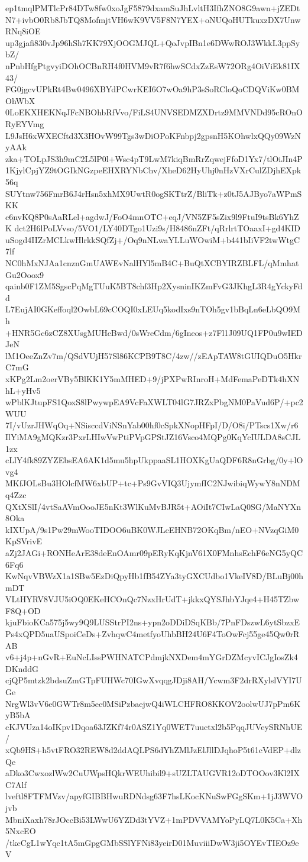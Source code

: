 ep1tmqlPMTlcPr84DTw8fw0xoJgF5879dxamSuJhLvltH3IfhZNO8G9awn+jZEDt
N7+ivbO0Rb8JbTQ8MofmjtVH6wK9VV5F8N7YEX+oNUQoHUTkuxzDX7UnwRNq8iOE
up3gjafi830vJp96hSh7KK79XjOOGMJQL+QoJvpIBn1e6DWwROJ3WkkL3ppSybZ/
nPnbHfgPtgvyiDOhOCBnRH4f0HVM9vR7f6hwSCdxZzEsW72ORg4OiViEk81IX43/
FG0jgcvUPkRt4Bw0496XBYdPCwrKEI6O7wOa9hP3sSoRCloQoCDQViKw0BMOhWbX
0LoEKXHEKNqJFcNBOhbRfVvo/FiLS4UNVSEDMZXDrtz9MMVNDd95cROnORyEYVmg
L9JsH6xWXECftd3X3HOvW99Tgs3wDiOPoKFnbpj2gpsnH5KOhwlxQQy09WzNyAAk
zka+TOLpJS3h9mC2L5lP0l+Wsc4pT9LwM7kiqBmRrZqwejFfoD1Yx7/tlOiJIn4P
1KjylCpjYZ9tOGIkNGzpeEHXRYNbChv/XheD62HyUhj0nHzVXrCulZDjhEXpk56q
SUYtnw756FmrB6J4rHsn5xhMX9UwtR0ogSKTtrZ/BliTk+z0tJ5AJByo7aWPmSKK
c6nvKQ8P0sAaRLel+agdwJ/FoO4mnOTC+eqJ/VN5ZF5sZix9l9FtuI9tsBk6YhZK
dct2H6lPoLVvso/5VO1/LY40DTgo1Uzi9s/H8486nZFt/qRrlrtTOaaxI+gd4KID
uSogd4IIZrMCLkwHlrkkSQfZj+/Oq9nNLwaYLLuWOwiM+b441bIiVF2twWtgC7lf
NC0hMxNJAa1cnznGmUAWEvNalHYl5mB4C+BuQtXCBYIRZBLFL/qMmhatGu2Ooox9
qainb0F1ZM5SgscPqMgTUuK5BT8chf3Hp2XysninIKZmFvG3JKhgL3R4gYckyFdd
L7EujAI0GKeffoql2OwbL69cCOQI0xLEUq5kodIxs9nTOh5gv1bBqLn6eLbQO9Mh
+HNR5Gc6zCZ8XUsgMUHcBwd/0sWreCdm/6gIneos+z7Fl1J09UQ1FP0u9wIEDJeN
lM1OeeZnZv7m/QSdVUjH57Sl86KCPB9T8C/4zw//zEApTAW8tGUIQDuO5HkrC7mG
xKPg2Lm2oerVBy5BlKK1Y5mMHED+9/jPXPwRInroH+MdFemaPeDTk4hXNhL+yHv5
wPblKJtupFS1QoxS8lPwywpEA9VcFaXWLT04lG7JRZxPbgNM0PaVud6P/+pc2WUU
7I/vUzrJHWqOq+NSisccdViNSnYab00hf0cSpkXNopHFpI/D/O8i/PTscs1Xw/r6
IlYiMA9gMQKzr3PxrLHIwVwPtiPVpGPStJZ16Vsco4MQPg0KqYcIULDA8sCJL1zx
cLlY4fk89ZYZEbsEA6AK1d5mu5hpUkppaaSL1HOXKgUaQDF6R8nGrbg/0y+lOvg4
MKfJOLsBu3HOlcfMW6xbUP+tc+Ps9GvVIQ3UjymfIC2NJwibiqWywY8nNDMq4Zzc
QXtXSlI/4vtSaAVmOooJE5nKt3WlKuMvBJR5t+AOiIt7CIwLaQ0SG/MaNYXn8Oka
kIXUpA/9s1Pw29mWooTIDOO6uBK0WJLcEHNB72OKqBm/nEO+NVzqGiM0KpSVrivE
aZj2JAGi+RONHeArE38deEnOAmr09pERyKqKjnV61X0FMnhsEchF6eNG5yQC6Fq6
KwNqvVBWzX1a1SBw5EzDiQpyHb1fB54ZYa3tyGXCUdbo1VkeIV8D/BLuBj00hmDT
VLtHYRV8VJU5iOQ0EKeHCOnQc7NzxHrUdT+jkkxQYSJhbYJqe4+H45TZbwF8Q+OD
kjuFbioKCa575j5wy9Q9LUSStrPI2ns+ypn2oDDiDSqKBb/7PnFDszwL6ytSbzxE
Ps4xQPD5uaUSpoiCeDs+ZvhqwC4metfyoUhbBH24U6F4ToOwFcj55ge45Qw0rRAB
v6+j4p+nGvR+EuNcLIssPWHNATCPdmjkNXDem4mYGrDZMcyvICJgIosZk4DKnddG
cjQP5mtzk2bdsuZmGTpFUHWc70IGwXvqqgJDji8AH/Ycwm3F2drRXylslVYI7UGe
NrgWl3vV6e0GWTr8m5ec0MSiPzbaejwQ4iWLCHFRO8KKOV2oolwUJ7pPm6KyB5bA
cKJVUza14oIKpv1Dqoa63JZKf74r0ASZ1Yq0WET7uuctxl2b5PqqJUVeySRNhUE/
xQb9HS+h5vtFRO32REW8d2ddAQLPS6dYhZMlJzElJllDJqhoP5t61cVdEP+dlzQe
aDko3CwxozlWw2CuUWpsHQkrWEUhibil9+sUZLTAUGVR12oDTOOov3Kl2IXC7Alf
lveftl8FTFMVzv/apyfGIBBHwuRDNdsg63F7hsLKocKNuSwFGgSKm+1jJ3WVOjvb
MbniXaxh78rJOccBi53LWwU6YZDd3tYVZ+1mPDVVAMYoPyLQ7L0K5Ca+Xh5NxcEO
/tkcCgL1wYqc1tA5mGpgGMbSSlYFNi83yeirD01MuviiiDwW3ji5OYEvTIEOz9eV
